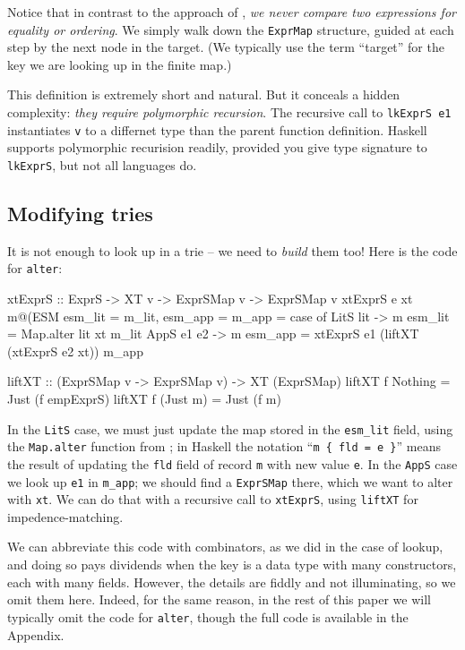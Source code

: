 \documentclass[acmsmall]{acmart}
\theoremstyle{theorem}
\theoremstyle{definition}
\theoremstyle{remark}
\begin{document}
Notice that in contrast to the approach of , \emph{we never compare two expressions
for equality or ordering}.  We simply walk down the \lstinline{ExprMap} structure, guided
at each step by the next node in the target.  (We typically use the term ``target'' for the
key we are looking up in the finite map.)

This definition is extremely short and natural. But it conceals a hidden
complexity: \emph{they require polymorphic recursion}. The recursive call to \lstinline{lkExprS e1}
instantiates \lstinline{v} to a differnet type than the parent function definition.
Haskell supports polymorphic recurision readily, provided you give type signature to
\lstinline{lkExprS}, but not all languages do.

\subsection{Modifying tries}

It is not enough to look up in a trie -- we need to \emph{build} them too!
Here is the code for \lstinline{alter}:
\begin{code}
xtExprS  :: ExprS -> XT v -> ExprSMap v -> ExprSMap v
xtExprS e xt m@(ESM { esm_lit = m_lit, esm_app = m_app }
  = case of
      LitS lit   -> m { esm_lit = Map.alter lit xt m_lit }
      AppS e1 e2 -> m { esm_app = xtExprS e1 (liftXT (xtExprS e2 xt)) m_app }

liftXT :: (ExprSMap v -> ExprSMap v) -> XT (ExprSMap)
liftXT f Nothing  = Just (f empExprS)
liftXT f (Just m) = Just (f m)
\end{code}
In the \lstinline{LitS} case, we must just update the map stored in the \lstinline{esm_lit} field,
using the \lstinline{Map.alter} function from ;
in Haskell the notation ``\lstinline|m { fld = e }|'' means the result
of updating the \lstinline{fld} field of record \lstinline{m} with new value \lstinline{e}.
In the \lstinline{AppS} case we look up \lstinline{e1} in \lstinline{m_app};
we should find a \lstinline{ExprSMap} there, which we want to alter with \lstinline{xt}.
We can do that with a recursive call to \lstinline{xtExprS}, using \lstinline{liftXT}
for impedence-matching.

We can abbreviate this code with combinators, as we did in the case of
lookup, and doing so pays dividends when the key is a data type with
many constructors, each with many fields.  However, the details are
fiddly and not illuminating, so we omit them here.  Indeed, for the
same reason, in the rest of this paper we will typically omit the code
for \lstinline{alter}, though the full code is available in the
Appendix.
\end{document}
